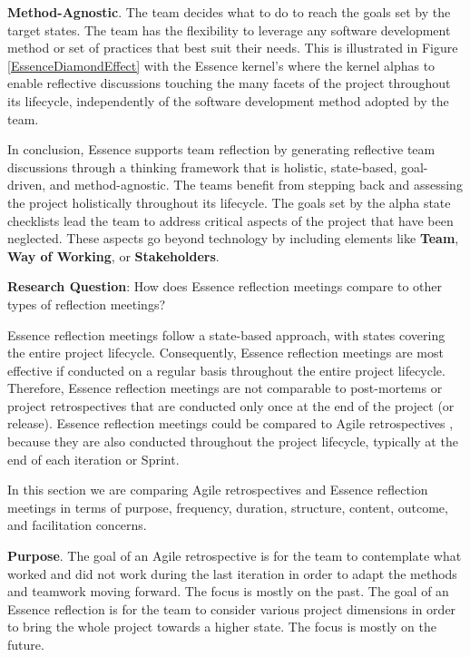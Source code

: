 \textbf{Method-Agnostic}. The team decides what to do to reach the goals set by the target states. The team has the flexibility to leverage any software development method or set of practices that best suit their needs. This is illustrated in Figure \ref{EssenceDiamondEffect} with the Essence kernel's  where the kernel alphas  to enable reflective discussions touching the many facets of the project throughout its lifecycle, independently of the software development method adopted by the team.

In conclusion, Essence supports team reflection by generating reflective team discussions through a thinking framework that is holistic, state-based, goal-driven, and method-agnostic. The teams benefit from stepping back and assessing the project holistically throughout its lifecycle. The goals set by the alpha state checklists lead the team to address critical aspects of the project that have been neglected. These aspects go beyond technology by including elements like \textbf{Team}, \textbf{Way of Working}, or \textbf{Stakeholders}.

\textbf{Research Question}: How does Essence reflection meetings compare to other types of reflection meetings?

Essence reflection meetings follow a state-based approach, with states covering the entire project lifecycle. Consequently, Essence reflection meetings are most effective if conducted on a regular basis throughout the entire project lifecycle. Therefore, Essence reflection meetings are not comparable to post-mortems or project retrospectives that are conducted only once at the end of the project (or release). Essence reflection meetings could be compared to Agile retrospectives \cite{Derby2006, KuaRetrospectiveHandbook}, because they are also conducted throughout the project lifecycle, typically at the end of each iteration or Sprint.

In this section we are comparing Agile retrospectives and Essence reflection meetings in terms of purpose, frequency, duration, structure, content, outcome, and facilitation concerns.

\textbf{Purpose}. The goal of an Agile retrospective is for the team to contemplate what worked and did not work during the last iteration in order to adapt the methods and teamwork moving forward. The focus is mostly on the past. The goal of an Essence reflection is for the team to consider various project dimensions in order to bring the whole project towards a higher state. The focus is mostly on the future.
  
